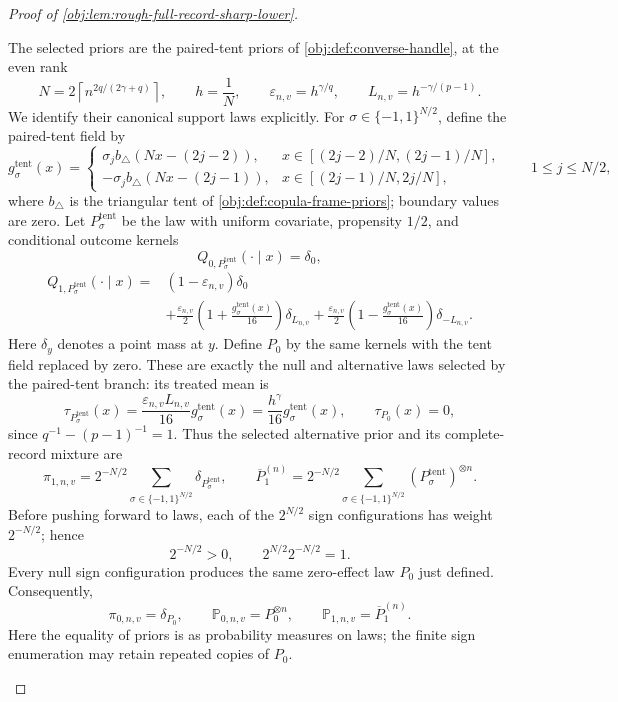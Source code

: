 \documentclass[11pt]{article}
\begin{document}
\begin{proof}[Proof of \cref{obj:lem:rough-full-record-sharp-lower}]
\begin{enumerate}
The selected priors are the paired-tent priors of
\cref{obj:def:converse-handle}, at the even rank
\[
N=2\left\lceil n^{2q/(2\gamma+q)}\right\rceil,
\qquad h=\frac1N,
\qquad \varepsilon_{n,v}=h^{\gamma/q},
\qquad L_{n,v}=h^{-\gamma/(p-1)}.
\]
We identify their canonical support laws explicitly. For
\(\sigma\in\{-1,1\}^{N/2}\), define the paired-tent field by
\[
g^{\mathrm{tent}}_\sigma(x)=
\begin{cases}
\sigma_j b_\triangle(Nx-(2j-2)),
&x\in[(2j-2)/N,(2j-1)/N],\\
-\sigma_j b_\triangle(Nx-(2j-1)),
&x\in[(2j-1)/N,2j/N],
\end{cases}
\qquad 1\le j\le N/2,
\]
where \(b_\triangle\) is the triangular tent of
\cref{obj:def:copula-frame-priors}; boundary values are zero.
Let \(P^{\mathrm{tent}}_\sigma\) be the law with uniform covariate,
propensity \(1/2\), and conditional outcome kernels
\[
Q_{0,P^{\mathrm{tent}}_\sigma}(\cdot\mid x)=\delta_0,
\]
\[
\begin{aligned}
Q_{1,P^{\mathrm{tent}}_\sigma}(\cdot\mid x)
={}&(1-\varepsilon_{n,v})\delta_0\\
&+\frac{\varepsilon_{n,v}}2
\left(1+\frac{g^{\mathrm{tent}}_\sigma(x)}{16}\right)\delta_{L_{n,v}}
+\frac{\varepsilon_{n,v}}2
\left(1-\frac{g^{\mathrm{tent}}_\sigma(x)}{16}\right)\delta_{-L_{n,v}}.
\end{aligned}
\]
Here \(\delta_y\) denotes a point mass at \(y\). Define \(P_0\) by the same kernels with the tent field replaced by zero. These are exactly the null and alternative laws selected by the paired-tent branch: its treated mean is
\[
\tau_{P^{\mathrm{tent}}_\sigma}(x)
=\frac{\varepsilon_{n,v}L_{n,v}}{16}g^{\mathrm{tent}}_\sigma(x)
=\frac{h^\gamma}{16}g^{\mathrm{tent}}_\sigma(x),
\qquad \tau_{P_0}(x)=0,
\]
since \(q^{-1}-(p-1)^{-1}=1\). Thus the selected alternative prior and its complete-record mixture are
\[
\pi_{1,n,v}
=2^{-N/2}\sum_{\sigma\in\{-1,1\}^{N/2}}
\delta_{P^{\mathrm{tent}}_\sigma},
\qquad
\overline P_1^{(n)}
=2^{-N/2}\sum_{\sigma\in\{-1,1\}^{N/2}}
(P^{\mathrm{tent}}_\sigma)^{\otimes n}.
\]
Before pushing forward to laws, each of the \(2^{N/2}\) sign configurations has weight \(2^{-N/2}\); hence
\[
2^{-N/2}>0,
\qquad
2^{N/2}2^{-N/2}=1.
\]
Every null sign configuration produces the same zero-effect law \(P_0\) just defined. Consequently,
\[
\pi_{0,n,v}=\delta_{P_0},
\qquad
\mathbb P_{0,n,v}=P_0^{\otimes n},
\qquad
\mathbb P_{1,n,v}=\overline P_1^{(n)}.
\]
Here the equality of priors is as probability measures on laws; the finite sign enumeration may retain repeated copies of \(P_0\).


\end{enumerate}
\end{proof}
\end{document}
